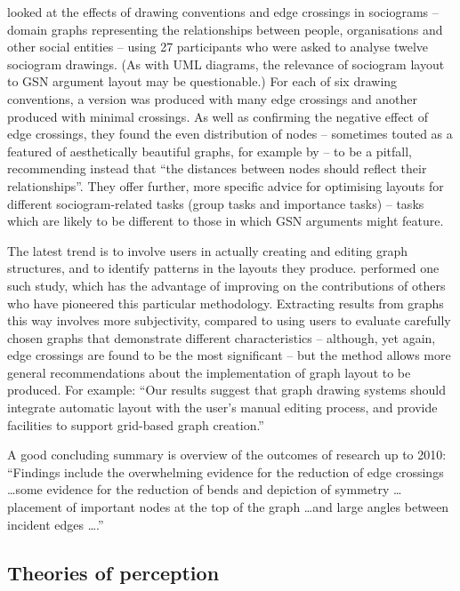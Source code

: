 \citet{huang2007effects} looked at the effects of drawing conventions and edge crossings in sociograms -- domain graphs representing the relationships between people, organisations and other social entities -- using 27 participants who were asked to analyse twelve sociogram drawings. (As with UML diagrams, the relevance of sociogram layout to GSN argument layout may be questionable.) For each of six drawing conventions, a version was produced with many edge crossings and another produced with minimal crossings. As well as confirming the negative effect of edge crossings, they found the even distribution of nodes -- sometimes touted as a featured of aesthetically beautiful graphs, for example by \citet{SPE:SPE4380211102} -- to be a pitfall, recommending instead that ``the distances between nodes should reflect their relationships''. They offer further, more specific advice for optimising layouts for different sociogram-related tasks (group tasks and importance tasks) -- tasks which are likely to be different to those in which GSN arguments might feature.

The latest trend is to involve users in actually creating and editing graph structures, and to identify patterns in the layouts they produce. \citet{5674033} performed one such study, which has the advantage of improving on the contributions of others who have pioneered this particular methodology. Extracting results from graphs this way involves more subjectivity, compared to using users to evaluate carefully chosen graphs that demonstrate different characteristics -- although, yet again, edge crossings are found to be the most significant -- but the method allows more general recommendations about the implementation of graph layout to be produced. For example: ``Our results suggest that graph drawing systems should integrate automatic layout with the user’s
manual editing process, and provide facilities to support grid-based graph creation.''

A good concluding summary is \citet{CRPITV106P80-88} overview of the outcomes of research up to 2010: ``Findings include
the overwhelming evidence for the reduction of edge
crossings \ldots some evidence for the reduction of
bends and depiction of symmetry \ldots
placement of important nodes at the top of the graph
\ldots and large angles between incident
edges \ldots.''

\subsection{Theories of perception \label{sec:gestalt}}

